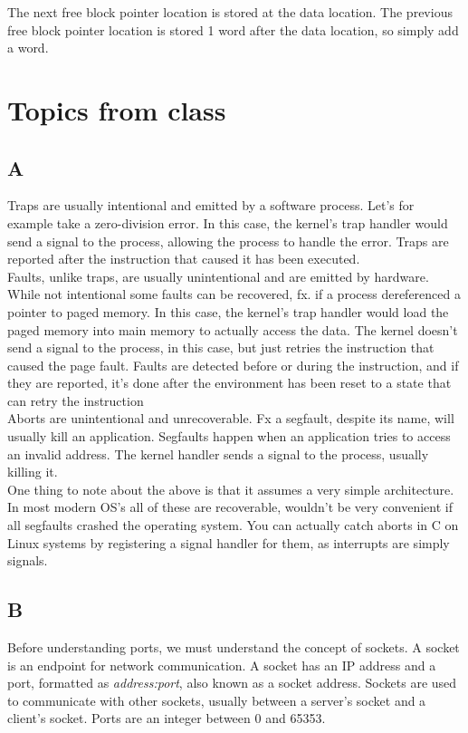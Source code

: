 \documentclass[11pt]{report}
\begin{document}
The next free block pointer location is stored at the data location. The previous free block pointer location is stored 1 word after the data location, so simply add a word.

\chapter{Topics from class}
\section{A}
Traps are usually intentional and emitted by a software process. Let's for example take a zero-division error. In this case, the kernel's trap handler would send a signal to the process, allowing the process to handle the error. Traps are reported after the instruction that caused it has been executed.\\[1ex]

Faults, unlike traps, are usually unintentional and are emitted by hardware. While not intentional some faults can be recovered, fx. if a process dereferenced a pointer to paged memory. In this case, the kernel's trap handler would load the paged memory into main memory to actually access the data. The kernel doesn't send a signal to the process, in this case, but just retries the instruction that caused the page fault. Faults are detected before or during the instruction, and if they are reported, it's done after the environment has been reset to a state that can retry the instruction\\[1ex]

Aborts are unintentional and unrecoverable. Fx a segfault, despite its name, will usually kill an application. Segfaults happen when an application tries to access an invalid address. The kernel handler sends a signal to the process, usually killing it.\\[1ex]

One thing to note about the above is that it assumes a very simple architecture. In most modern OS's all of these are recoverable, wouldn't be very convenient if all segfaults crashed the operating system. You can actually catch aborts in C on Linux systems\cite{catch-signal} by registering a signal handler for them, as interrupts are simply signals. 

\section{B}
Before understanding ports, we must understand the concept of sockets. A socket is an endpoint for network communication. A socket has an IP address and a port, formatted as \textit{address:port}, also known as a socket address. Sockets are used to communicate with other sockets, usually between a server's socket and a client's socket. Ports are an integer between 0 and 65353.\\[1ex]
\end{document}

